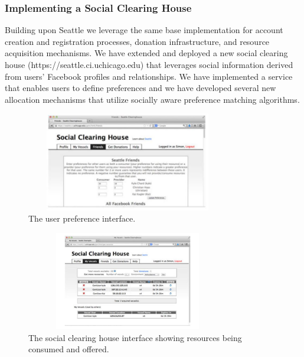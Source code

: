 \documentclass[a4paper,12pt]{article}
\begin{document}
	\subsubsection{Implementing a Social Clearing House}
Building upon Seattle we leverage the same base implementation for account creation and registration processes,
donation infrastructure, and resource acquisition mechanisms. We have extended and deployed a new social clearing house (https://seattle.ci.uchicago.edu) that leverages
social information derived from users’ Facebook profiles
and relationships. We have implemented a service that enables users to define preferences and we have developed several new allocation mechanisms that utilize socially aware
preference matching algorithms.
            \begin{figure}[htp]
                \begin{center}
                    \includegraphics[height=1.7in,width=3.5in]{jpg/fig2.JPG}
                \end{center}
                \caption{The user preference interface.} \label{Fig:2}
            \end{figure}
            \begin{figure}[htp]
                \begin{center}
                    \includegraphics[height=1.7in,width=3.5in]{jpg/fig3.JPG}
                \end{center}
                \caption{The social clearing house interface showing resources being consumed and offered.} \label{Fig:3}
            \end{figure}
\end{document}

